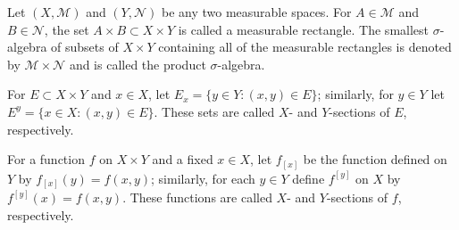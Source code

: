 Let $(X, \mathcal{M})$ and $(Y, \mathcal{N})$ be any two measurable spaces. For $A \in \mathcal{M}$ and $B \in \mathcal{N}$, the set $A \times B \subset X \times Y$ is called a measurable rectangle. The smallest $\sigma$-algebra of subsets of $X \times Y$ containing all of the measurable rectangles is denoted by $\mathcal{M} \times \mathcal{N}$ and is called the product $\sigma$-algebra.

For $E \subset X \times Y$ and $x \in X$, let $E_x = \{y \in Y : (x, y) \in E\}$; similarly, for $y \in Y$ let $E^y = \{x \in X : (x, y) \in E\}$. These sets are called $X$- and $Y$-sections of $E$, respectively.

For a function $f$ on $X \times Y$ and a fixed $x \in X$, let $f_{[x]}$ be the function defined on $Y$ by $f_{[x]}(y) = f(x, y)$; similarly, for each $y \in Y$ define $f^{[y]}$ on $X$ by $f^{[y]}(x) = f(x, y)$. These functions are called $X$- and $Y$-sections of $f$, respectively.
